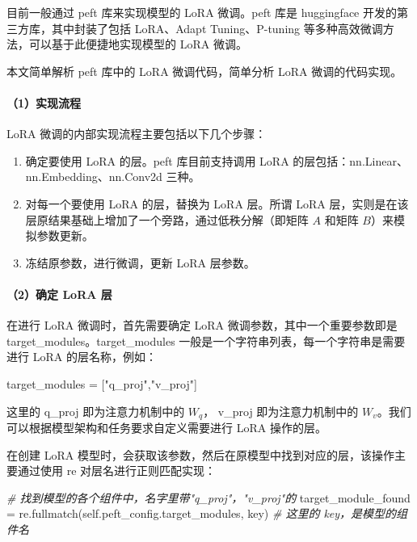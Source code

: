 \documentclass[
]{article}
\newenvironment{Shaded}{}{}
\newcommand{\CommentTok}[1]{\textcolor[rgb]{0.38,0.63,0.69}{\textit{#1}}}
\newcommand{\NormalTok}[1]{#1}
\newcommand{\OperatorTok}[1]{\textcolor[rgb]{0.40,0.40,0.40}{#1}}
\newcommand{\StringTok}[1]{\textcolor[rgb]{0.25,0.44,0.63}{#1}}
\newcommand{\VariableTok}[1]{\textcolor[rgb]{0.10,0.09,0.49}{#1}}
\begin{document}
目前一般通过 peft 库来实现模型的 LoRA 微调。peft 库是 huggingface
开发的第三方库，其中封装了包括 LoRA、Adapt Tuning、P-tuning
等多种高效微调方法，可以基于此便捷地实现模型的 LoRA 微调。

本文简单解析 peft 库中的 LoRA 微调代码，简单分析 LoRA 微调的代码实现。

\paragraph{（1）实现流程}\label{ux5b9eux73b0ux6d41ux7a0b}

LoRA 微调的内部实现流程主要包括以下几个步骤：

\begin{enumerate}
\def\labelenumi{\arabic{enumi}.}
\item
  确定要使用 LoRA 的层。peft 库目前支持调用 LoRA
  的层包括：nn.Linear、nn.Embedding、nn.Conv2d 三种。
\item
  对每一个要使用 LoRA 的层，替换为 LoRA 层。所谓 LoRA
  层，实则是在该层原结果基础上增加了一个旁路，通过低秩分解（即矩阵 \(A\)
  和矩阵 \(B\)）来模拟参数更新。
\item
  冻结原参数，进行微调，更新 LoRA 层参数。
\end{enumerate}

\paragraph{（2）确定 LoRA 层}\label{ux786eux5b9a-lora-ux5c42}

在进行 LoRA 微调时，首先需要确定 LoRA 微调参数，其中一个重要参数即是
target\_modules。target\_modules
一般是一个字符串列表，每一个字符串是需要进行 LoRA 的层名称，例如：

\begin{Shaded}
\begin{Highlighting}[]
\NormalTok{target\_modules }\OperatorTok{=}\NormalTok{ [}\StringTok{"q\_proj"}\NormalTok{,}\StringTok{"v\_proj"}\NormalTok{]}
\end{Highlighting}
\end{Shaded}

这里的 q\_proj 即为注意力机制中的 \(W_q\)， v\_proj 即为注意力机制中的
\(W_v\)。我们可以根据模型架构和任务要求自定义需要进行 LoRA 操作的层。

在创建 LoRA
模型时，会获取该参数，然后在原模型中找到对应的层，该操作主要通过使用 re
对层名进行正则匹配实现：

\begin{Shaded}
\begin{Highlighting}[]
\CommentTok{\# 找到模型的各个组件中，名字里带"q\_proj"，"v\_proj"的}
\NormalTok{target\_module\_found }\OperatorTok{=}\NormalTok{ re.fullmatch(}\VariableTok{self}\NormalTok{.peft\_config.target\_modules, key)}
\CommentTok{\# 这里的 key，是模型的组件名}
\end{Highlighting}
\end{Shaded}
\end{document}
